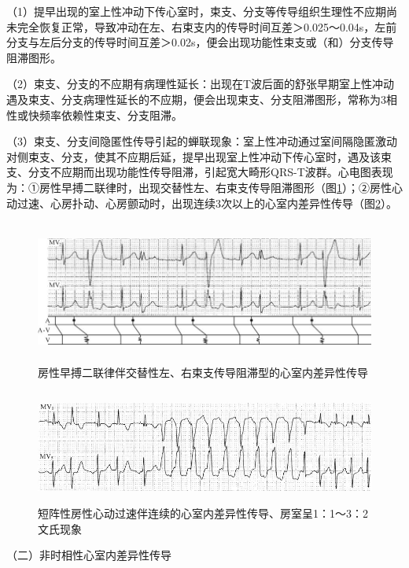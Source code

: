 （1）提早出现的室上性冲动下传心室时，束支、分支等传导组织生理性不应期尚未完全恢复正常，导致冲动在左、右束支内的传导时间互差＞0.025～0.04s，左前分支与左后分支的传导时间互差＞0.02s，便会出现功能性束支或（和）分支传导阻滞图形。

（2）束支、分支的不应期有病理性延长：出现在T波后面的舒张早期室上性冲动遇及束支、分支病理性延长的不应期，便会出现束支、分支阻滞图形，常称为3相性或快频率依赖性束支、分支阻滞。

（3）束支、分支间隐匿性传导引起的蝉联现象：室上性冲动通过室间隔隐匿激动对侧束支、分支，使其不应期后延，提早出现室上性冲动下传心室时，遇及该束支、分支不应期而出现功能性传导阻滞，引起宽大畸形QRS-T波群。心电图表现为：①房性早搏二联律时，出现交替性左、右束支传导阻滞图形（图\ref{fig3-14}）；②房性心动过速、心房扑动、心房颤动时，出现连续3次以上的心室内差异性传导（图\ref{fig3-15}）。

\begin{figure}[!htbp]
 \centering
 \includegraphics[width=5.77083in,height=1.84375in]{./images/Image00064.jpg}
 \captionsetup{justification=centering}
 \caption{房性早搏二联律伴交替性左、右束支传导阻滞型的心室内差异性传导}
 \label{fig3-14}
  \end{figure} 

\begin{figure}[!htbp]
 \centering
 \includegraphics[width=5.58333in,height=1.46875in]{./images/Image00065.jpg}
 \captionsetup{justification=centering}
 \caption{短阵性房性心动过速伴连续的心室内差异性传导、房室呈1：1～3：2文氏现象}
 \label{fig3-15}
  \end{figure} 

（二）非时相性心室内差异性传导

